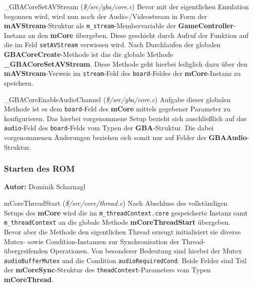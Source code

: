 \documentclass[11pt,a4paper]{scrartcl}
\newcommand{\AutorDominik} {
    \vspace{-4mm}
    \large \textbf{Autor:} Dominik Scharnagl \normalsize
    \vspace{2mm}
}
\begin{document}
\vspace{5mm}
\large {\_}GBACoreSetAVStream \normalsize(\textit{\$/src/gba/core.c})
\vspace{2mm}\newline
Bevor mit der eigentlichen Emulation begonnen wird, wird nun noch der Audio-/Videostream in Form der \textbf{mAVStream}-Struktur als \verb|m_stream|-Membervariable der \textbf{GameController}-Instanz an den \textbf{mCore} \"ubergeben. Diese geschieht durch Aufruf der Funktion auf die im Feld \verb|setAVStream| verwiesen wird. Nach Durchlaufen der globalen \textbf{GBACoreCreate}-Methode ist das die globale Methode \textbf{{\_}GBACoreSetAVStream}. Diese Methode geht hierbei lediglich dazu \"uber den \textbf{mAVStream}-Verweis im \verb|stream|-Feld des \verb|board|-Feldes der \textbf{mCore}-Instanz zu speichern.

\vspace{5mm}
\large {\_}GBACoreEnableAudioChannel \normalsize(\textit{\$/src/gba/core.c})
\vspace{2mm}\newline
Aufgabe dieser globalen Methode ist es dem \verb|board|-Feld des \textbf{mCore} mittels gegebener Parameter zu konfigurieren. Das hierbei vorgenommene Setup bezieht sich auschlie{\ss}lich auf das \verb|audio|-Feld des \verb|board|-Felds vom Typen der \textbf{GBA}-Struktur. Die dabei vorgenommenen \"Anderungen beziehen sich somit nur auf Felder der \textbf{GBAAudio}-Struktur.


\subsubsection{Starten des ROM}
\AutorDominik

\large mCoreThreadStart \normalsize(\textit{\$/src/core/thread.c})
\vspace{2mm}\newline
Nach Abschluss des vollst\"andigen Setups des \textbf{mCore} wird die im \verb|m_threadContext.core| gespeicherte Instanz samt \verb|m_threadContext| an die globale Methode \textbf{mCoreThreadStart} \"ubergeben. Bevor aber die Methode den eigentlichen Thread erzeugt initialisiert sie diverse Mutex- sowie Condition-Instanzen zur Synchronisation der Thread-\"ubergreifenden Operationen. Von besonderer Bedeutung sind hierbei der Mutex \verb|audioBufferMutex| und die Condition \verb|audioRequiredCond|. Beide Felder sind Teil der \textbf{mCoreSync}-Struktur des \verb|theadContext|-Parameters vom Typen \textbf{mCoreThread}.
\end{document}

